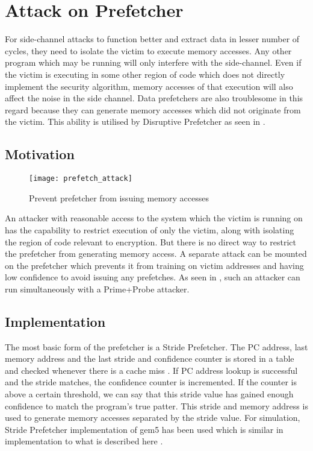 \chapter{Attack on Prefetcher}

For side-channel attacks to function better and extract data in lesser number
of cycles, they need to isolate the victim to execute memory accesses.
Any other program which may be running will only interfere with the side-channel.
Even if the victim is executing in some other region of code which does not
directly implement the security algorithm, memory accesses of that execution
will also affect the noise in the side channel. Data prefetchers are
also troublesome in this regard because they can generate memory accesses which
did not originate from the victim. This ability is utilised by Disruptive Prefetcher
as seen in .

\section{Motivation}

\begin{figure}[ht]
    \centering
    \texttt{[image: prefetch\_attack]}
    \caption{Prevent prefetcher from issuing memory accesses}
    \label{fig:prefetch_attack}
\end{figure}

An attacker with reasonable access to the system which the victim is running on
has the capability to restrict execution of only the victim, along with
isolating the region of code relevant to encryption. But there is no
direct way to restrict the prefetcher from generating memory access.
A separate attack can be mounted on the prefetcher which prevents it
from training on victim addresses and having low confidence to
avoid issuing any prefetches. As seen in , such an
attacker can run simultaneously with a Prime+Probe attacker.

\section{Implementation}

The most basic form of the prefetcher is a Stride Prefetcher. The PC address,
last memory address and the last stride and confidence counter is
stored in a table and checked whenever there is a cache miss .
If PC address lookup is successful and the stride matches,
the confidence counter is incremented.
If the counter is above a certain threshold, we can say that this stride value
has gained enough confidence to match the program's true patter. This stride
and memory address is used to generate memory accesses separated by the stride
value. For simulation, Stride Prefetcher implementation of gem5 
has been used which is similar in implementation to what is described here
.

